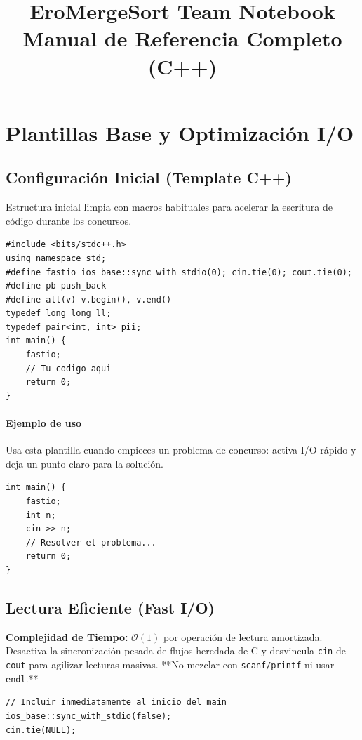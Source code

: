 \documentclass[10pt,twocolumn,letterpaper]{report}
\begin{document}
\tableofcontents
\newpage

\title{\vspace{-0.5in}\Huge \bfseries EroMergeSort Team Notebook \\ \Large Manual de Referencia Completo (C++)}
\author{\large }
\maketitle
\thispagestyle{fancy}
\setcounter{tocdepth}{2}

\newpage
\chapter{Plantillas Base y Optimización I/O}
\section{Configuración Inicial (Template C++)}
Estructura inicial limpia con macros habituales para acelerar la escritura de código durante los concursos.
\begin{lstlisting}
#include <bits/stdc++.h>
using namespace std;
#define fastio ios_base::sync_with_stdio(0); cin.tie(0); cout.tie(0);
#define pb push_back
#define all(v) v.begin(), v.end()
typedef long long ll;
typedef pair<int, int> pii;
int main() {
    fastio;
    // Tu codigo aqui
    return 0;
}
\end{lstlisting}
\subsubsection*{Ejemplo de uso}
Usa esta plantilla cuando empieces un problema de concurso: activa I/O rápido y deja un punto claro para la solución.
\begin{lstlisting}
int main() {
    fastio;
    int n;
    cin >> n;
    // Resolver el problema...
    return 0;
}
\end{lstlisting}

\section{Lectura Eficiente (Fast I/O)}
\textbf{Complejidad de Tiempo:} $\mathcal{O}(1)$ por operación de lectura amortizada. \\
Desactiva la sincronización pesada de flujos heredada de C y desvincula \texttt{cin} de \texttt{cout} para agilizar lecturas masivas. **No mezclar con \texttt{scanf/printf} ni usar \texttt{endl}.**
\begin{lstlisting}
// Incluir inmediatamente al inicio del main
ios_base::sync_with_stdio(false);
cin.tie(NULL);
\end{lstlisting}
\end{document}
